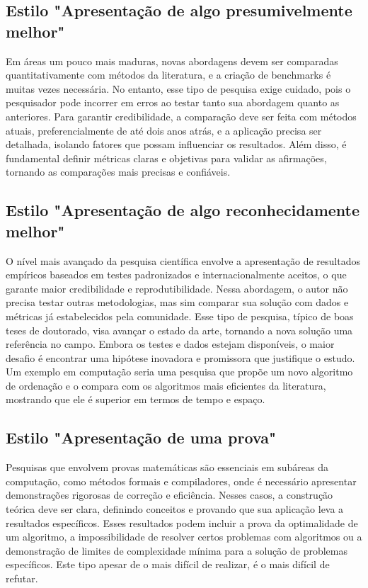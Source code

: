 \documentclass[
	12pt,				%
	openright,			%
	oneside,			%
	a4paper,			%
	chapter=TITLE,		%
	subsection=TITLE,	%
	english,			%
	brazilian,				%
	]{abntex2}
\begin{document}
\subsection*{Estilo "Apresentação de algo presumivelmente melhor"}
Em áreas um pouco mais maduras, novas abordagens devem ser comparadas quantitativamente com métodos da literatura, e a criação de benchmarks é muitas vezes necessária. No entanto, esse tipo de pesquisa exige cuidado, pois o pesquisador pode incorrer em erros ao testar tanto sua abordagem quanto as anteriores. Para garantir credibilidade, a comparação deve ser feita com métodos atuais, preferencialmente de até dois anos atrás, e a aplicação precisa ser detalhada, isolando fatores que possam influenciar os resultados. Além disso, é fundamental definir métricas claras e objetivas para validar as afirmações, tornando as comparações mais precisas e confiáveis.

\subsection*{Estilo "Apresentação de algo reconhecidamente melhor"}
O nível mais avançado da pesquisa científica envolve a apresentação de resultados empíricos baseados em testes padronizados e internacionalmente aceitos, o que garante maior credibilidade e reprodutibilidade. Nessa abordagem, o autor não precisa testar outras metodologias, mas sim comparar sua solução com dados e métricas já estabelecidos pela comunidade. Esse tipo de pesquisa, típico de boas teses de doutorado, visa avançar o estado da arte, tornando a nova solução uma referência no campo. Embora os testes e dados estejam disponíveis, o maior desafio é encontrar uma hipótese inovadora e promissora que justifique o estudo. Um exemplo em computação seria uma pesquisa que propõe um novo algoritmo de ordenação e o compara com os algoritmos mais eficientes da literatura, mostrando que ele é superior em termos de tempo e espaço.

\subsection*{Estilo "Apresentação de uma prova"}
Pesquisas que envolvem provas matemáticas são essenciais em subáreas da computação, como métodos formais e compiladores, onde é necessário apresentar demonstrações rigorosas de correção e eficiência. Nesses casos, a construção teórica deve ser clara, definindo conceitos e provando que sua aplicação leva a resultados específicos. Esses resultados podem incluir a prova da optimalidade de um algoritmo, a impossibilidade de resolver certos problemas com algoritmos ou a demonstração de limites de complexidade mínima para a solução de problemas específicos. Este tipo apesar de o mais difícil de realizar, é o mais difícil de refutar.
\end{document}
